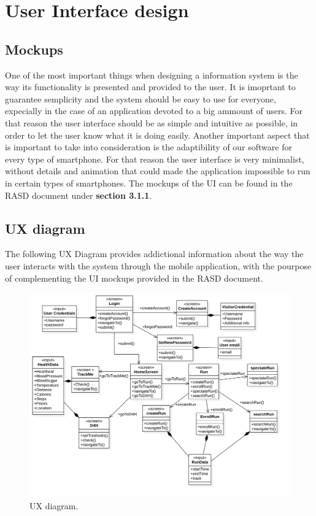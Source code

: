 \documentclass[12pt]{article}
\begin{document}
\newpage
\section{User Interface design}

\subsection{Mockups} One of the most important things when designing a information system is the way its functionality is presented and provided to the user. It is imoprtant to guarantee semplicity and the system should be easy to use for everyone, expecially in the case of an application devoted to a big ammount of users. For that reason the user interface should be as simple and intuitive as possible, in order to let the user know what it is doing easily. 
    Another important aspect that is important to take into consideration is the adaptibility of our software for every type of smartphone. For that reason the user interface is very minimalist, without details and animation that could made the application impossible to run in certain types of smartphones. The mockups of the UI can be found in the RASD document under \textbf{section 3.1.1}.
    
\subsection{UX diagram} 

The following UX Diagram provides addictional information about the way the user interacts with the system through the mobile application, with the pourpose of complementing the UI mockups provided in the RASD document. 

\begin{figure}[H]
    \centering
    \includegraphics[scale=0.33, angle=-90, origin=c]{UXdiagram.png}
    \caption{UX diagram.}
    \label{fig:UX diagram}
\end{figure}
\end{document}
